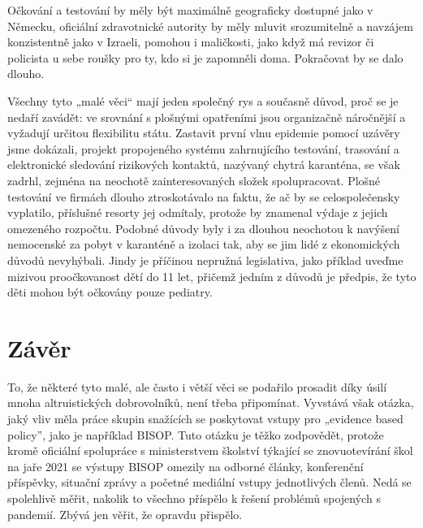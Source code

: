 Očkování a testování by měly být maximálně geograficky dostupné jako v Německu, oficiální zdravotnické autority by měly mluvit srozumitelně a navzájem konzistentně jako v Izraeli, pomohou i maličkosti, jako když má revizor či policista u sebe roušky pro ty, kdo si je zapomněli doma. Pokračovat by se dalo dlouho.

Všechny tyto „malé věci“ mají jeden společný rys a současně důvod, proč se je nedaří zavádět: ve srovnání s plošnými opatřeními jsou organizačně náročnější a vyžadují určitou flexibilitu státu. Zastavit první vlnu epidemie pomocí uzávěry jsme dokázali, projekt propojeného systému zahrnujícího testování, trasování a elektronické sledování rizikových kontaktů, nazývaný chytrá karanténa, se však zadrhl, zejména na neochotě zainteresovaných složek spolupracovat. Plošné testování ve firmách dlouho ztroskotávalo na faktu, že ač by se celospolečensky vyplatilo, příslušné resorty jej odmítaly, protože by znamenal výdaje z jejich omezeného rozpočtu. Podobné důvody byly i za dlouhou neochotou k navýšení nemocenské za pobyt v karanténě a izolaci tak, aby se jim lidé z ekonomických důvodů nevyhýbali. Jindy je příčinou nepružná legislativa, jako příklad uveďme mizivou proočkovanost dětí do 11 let, přičemž jedním z důvodů je předpis, že tyto děti mohou být očkovány pouze pediatry. 

\section*{Závěr}

To, že některé tyto malé, ale často i větší věci se podařilo prosadit díky úsilí mnoha altruistických dobrovolníků, není třeba připomínat. Vyvstává však otázka, jaký vliv měla  práce skupin snažících se poskytovat vstupy pro „evidence based policy”, jako je například BISOP.  Tuto otázku je těžko zodpovědět, protože kromě oficiální spolupráce s ministerstvem školství týkající se znovuotevírání škol na jaře 2021 se výstupy BISOP omezily na odborné články, konferenční příspěvky, situační zprávy a početné mediální vstupy jednotlivých členů. Nedá se spolehlivě měřit, nakolik to všechno příspělo k řešení problémů spojených s pandemií. Zbývá jen věřit, že opravdu přispělo.


